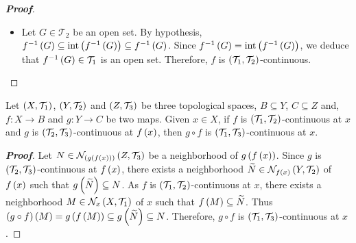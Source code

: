 \begin{proposition}
\begin{proof}[\rm\textbf{Proof}]
\begin{itemize}
      \begin{equation}
        \begin{split}
          f^{-1}\pr{\interior\pr{B}} & =f^{-1}\pr{Y\setminus\overline{Y\setminus B}}=X\setminus f^{-1}\pr{\overline{Y\setminus B}}\subseteq X\setminus\overline{A}=\interior\pr{X\setminus A}\\
          & =\interior\pr{f^{-1}\pr{B}}.
        \end{split}
      \end{equation}
      \item[\boxed{5\Rightarrow1}] Let $G\in\mathcal{T}_2$ be an open set. By hypothesis, $f^{-1}\left(G\right)\subseteq\operatorname{int}\left(f^{-1}\left(G\right)\right)\subseteq f^{-1}\left(G\right)$. Since $f^{-1}\left(G\right)=\operatorname{int}\left(f^{-1}\left(G\right)\right)$, we deduce that $f^{-1}\left(G\right)\in\mathcal{T}_1$ is an open set. Therefore, $f$ is $\left(\mathcal{T}_1,\mathcal{T}_2\right)$-continuous.
    \end{itemize}
  \end{proof}
\end{proposition}

\begin{proposition}
  Let $\left(X,\mathcal{T}_1\right)$, $\left(Y,\mathcal{T}_2\right)$ and $\left(Z,\mathcal{T}_3\right)$ be three topological spaces, $B\subseteq Y$, $C\subseteq Z$ and, $f:X\rightarrow B$ and $g:Y\rightarrow C$ be two maps. Given $x\in X$, if $f$ is $\left(\mathcal{T}_1,\mathcal{T}_2\right)$-continuous at $x$ and $g$ is $\left(\mathcal{T}_2,\mathcal{T}_3\right)$-continuous at $f\left(x\right)$, then $g\circ f$ is $\left(\mathcal{T}_1,\mathcal{T}_3\right)$-continuous at $x$.
  
  \begin{proof}[\rm\textbf{Proof}]
    Let $N\in\mathcal{N}_{\left(g\left(f\left(x\right)\right)\right)}\left(Z,\mathcal{T}_3\right)$ be a neighborhood of $g\left(f\left(x\right)\right)$. Since $g$ is $\left(\mathcal{T}_2,\mathcal{T}_3\right)$-continuous at $f\left(x\right)$, there exists a neighborhood $\widetilde{N}\in\mathcal{N}_{f\left(x\right)}\left(Y,\mathcal{T}_2\right)$ of $f\left(x\right)$ such that $g\left(\widetilde{N}\right)\subseteq N$. As $f$ is $\left(\mathcal{T}_1,\mathcal{T}_2\right)$-continuous at $x$, there exists a neighborhood $M\in\mathcal{N}_{x}\left(X,\mathcal{T}_1\right)$ of $x$ such that $f\left(M\right)\subseteq\widetilde{N}$. Thus $\left(g\circ f\right)\left(M\right)=g\left(f\left(M\right)\right)\subseteq g\left(\widetilde{N}\right)\subseteq N$. Therefore, $g\circ f$ is $\left(\mathcal{T}_1,\mathcal{T}_3\right)$-continuous at $x$.
  \end{proof}
\end{proposition}

